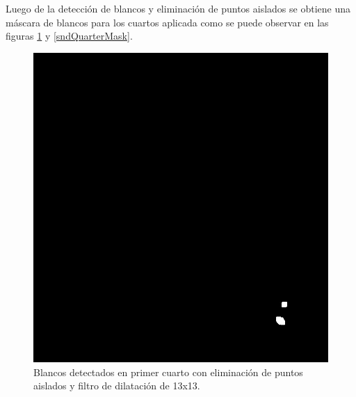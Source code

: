 \documentclass[10pt,a4paper, twoside]{report}
\begin{document}
Luego de la detección de blancos y eliminación de puntos aislados se obtiene una máscara de blancos para los cuartos aplicada como se puede observar en las figuras \ref{firstQuarterMask} y \ref{sndQuarterMask}.


\begin{figure}[!htb]
   \begin{minipage}{0.48\textwidth}
			\centering
			\includegraphics[width=1.0\linewidth]{imagenes/fstQuarterFourierMask.jpg}
			\caption{Blancos detectados en primer cuarto con eliminación de puntos aislados y filtro de dilatación de 13x13.}
			\label{firstQuarterMask}
   \end{minipage}\hfill
   \begin {minipage}{0.48\textwidth}
			\centering

\end{minipage}
\end{figure}
\end{document}
